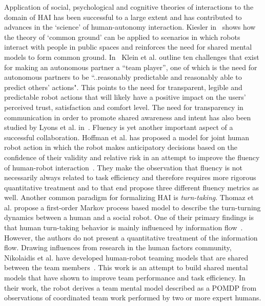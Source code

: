 \documentclass[12pt]{article}
\begin{document}
Application of social, psychological and cognitive theories of interactions to the domain of HAI has been successful to a large extent and has contributed to advances in the `science' of human-autonomy interaction. Kiesler in~\cite{kiesler2005fostering} shows how the theory of `common ground' can be applied to scenarios in which robots interact with people in public spaces and reinforces the need for shared mental models to form common ground. In~\cite{klien2004ten} Klein et al. outline ten challenges that exist for making an autonomous partner a ``team player'', one of which is the need for autonomous partners to be ``..reasonably predictable and reasonably able to predict others' actions". This points to the need for transparent, legible and predictable robot actions that will likely have a positive impact on the users' perceived trust, satisfaction and comfort level. The need for transparency in communication in order to promote shared awareness and intent has also been studied by Lyons et al. in~\cite{lyons2014transparency}. Fluency is yet another important aspect of a successful collaboration. Hoffman et al. has proposed a model for joint human robot action in which the robot makes anticipatory decisions based on the confidence of their validity and relative risk in an attempt to improve the fluency of human-robot interaction~\cite{hoffman2007cost}. They make the observation that fluency is not necessarily always related to task efficiency and therefore requires more rigorous quantitative treatment and to that end propose three different fluency metrics as well. Another common paradigm for formalizing HAI is \textit{turn-taking}. Thomaz et al. propose a first-order Markov process based model to describe the turn-turning dynamics between a human and a social robot. One of their primary findings is that human turn-taking behavior is mainly influenced by information flow~\cite{thomaz2011turn}. However, the authors do not present a quantitative treatment of the information flow. Drawing influences from research in the human factors community, Nikolaidis et al. have developed human-robot teaming models that are shared between the team members~\cite{nikolaidis2012human}. This work is an attempt to build shared mental models that have shown to improve team performance and task efficiency. In their work, the robot derives a team mental model described as a POMDP from observations of coordinated team work performed by two or more expert humans. 
\end{document}
